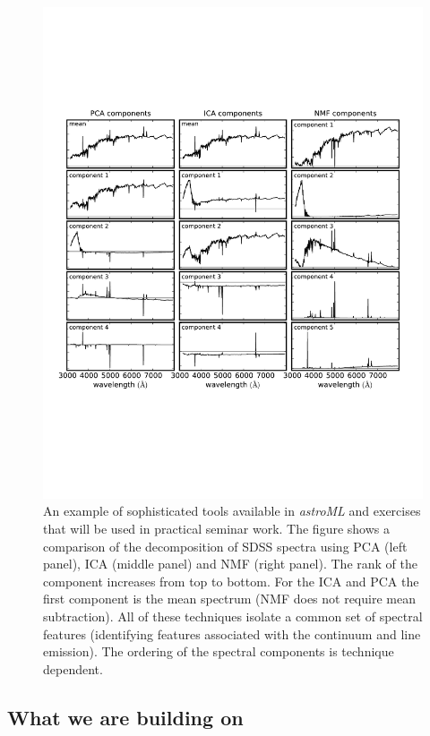 \begin{figure}[!t]
\vskip -1.8in
\includegraphics[width=1.02\hsize,clip]{astroML2.pdf}
\vskip -2.0in
\caption{An example of sophisticated tools available in {\it astroML} and exercises that will be
used in practical seminar work. The figure shows a comparison of the decomposition of SDSS 
spectra using PCA (left panel), ICA (middle panel) and NMF (right panel). The rank of the component
increases from top to bottom. For the ICA and PCA the first component is the mean spectrum (NMF 
does not require mean subtraction). All of these techniques isolate a common set of spectral features 
(identifying features associated with the continuum and line emission). The ordering of the spectral 
components is technique dependent.} 
\label{Fig:astroML2}
\end{figure}

\subsection{What we are building on}
\label{sec:precursors}

